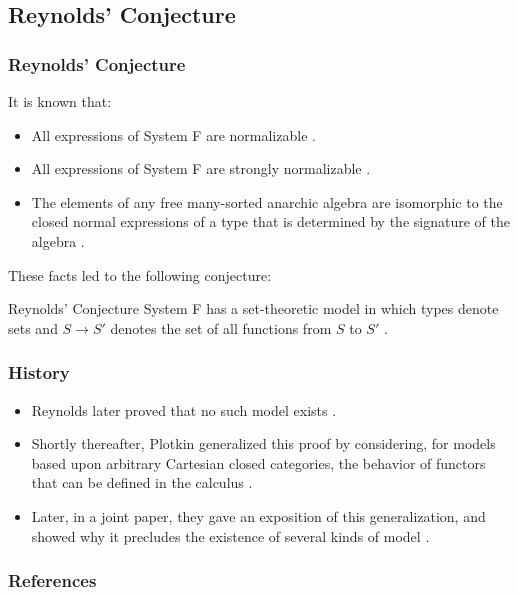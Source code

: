 \subsection{Reynolds' Conjecture}

\begin{frame}[fragile]
    \frametitle{Reynolds' Conjecture}
  
    It is known that:
    \begin{itemize}
        \item All expressions of System F are normalizable \cite{girard1972phd}.
        \item All expressions of System F are strongly normalizable \cite{PRAWITZ1971235}.
        \item The elements of any free many-sorted anarchic algebra are isomorphic to the closed normal expressions of a type that is determined by the signature of the algebra \cite{BOHM1985135}.
    \end{itemize}

    These facts led to the following conjecture:
    \begin{block}{Reynolds' Conjecture}
		System F has a set-theoretic model in which types denote sets and $S \rightarrow S'$ denotes the set of all functions from $S$ to $S'$ \cite{reynolds1983types}.
	\end{block}
\end{frame}

\begin{frame}[fragile]
    \frametitle{History}
  
    \begin{itemize}
        \item Reynolds later proved that no such model exists \cite{reynold-not-set-theoretic}.
        \item Shortly thereafter, Plotkin generalized this proof by considering, for models based upon arbitrary Cartesian closed categories, the behavior of functors that can be defined in the calculus \cite{plotkin-non-existing-article}.
        \item Later, in a joint paper, they gave an exposition of this generalization, and showed why it precludes the existence of several kinds of model \cite{REYNOLDS19931}.
    \end{itemize}
\end{frame}

\begin{frame}[t,allowframebreaks]
\nocite{*}
\frametitle{References}


\end{frame}
